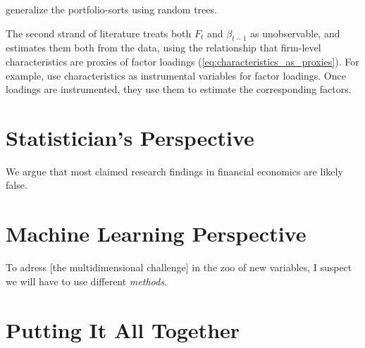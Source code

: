 		\cite{bryzgalova2019forest} generalize the portfolio-sorts using random trees.     
		
		The second strand of literature treats both $F_t$ and $\beta_{t-1}$ as unobservable, and estimates them both from the data, using the  relationship that firm-level characteristics are proxies of factor loadings (\ref{eq:characteristics_as_proxies}). For example, \cite{kelly2019characteristics} use characteristics as instrumental variables for factor loadings. Once loadings are instrumented, they use them to estimate the corresponding factors.
	
	\section{Statistician's Perspective} 
		
		\epigraph{We argue that most claimed research findings in financial economics are likely false. }{\cite{harvey2016and}}
	
	\section{Machine Learning Perspective}
	
		\epigraph{To adress [the multidimensional challenge] in the zoo of new variables, I suspect we will have to use different \textit{methods}.}{\cite{cochrane2011presidential}}
	
		\cite{gu2020empirical} 
    
	\section{Putting It All Together}
	

	
	   
	
	   
	



